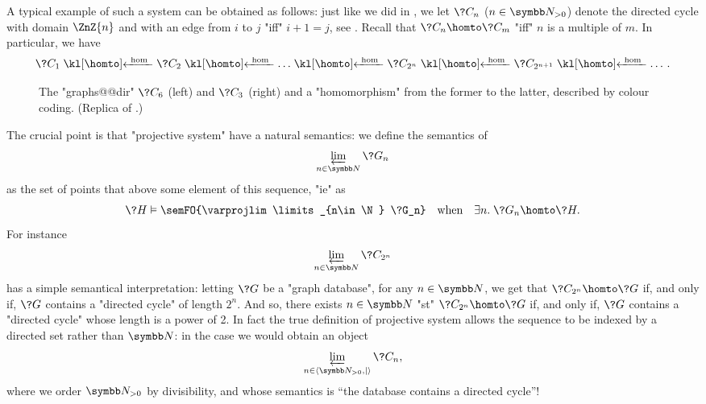 A typical example of such a system can be obtained as follows:
just like we did in ,
we let $\?C_n$ ($n\in\Np$) denote the directed cycle with domain $\ZnZ{n}$
and with an edge from $i$ to $j$ "iff" $i+1 = j$, see .
Recall that $\?C_n \homto \?C_m$ "iff" $n$ is a multiple of $m$.
In particular, we have
\[
	\?C_1 \cohomto \?C_2 \cohomto \dotsc \cohomto \?C_{2^n} \cohomto \?C_{2^{n+1}} \cohomto \dotsc.
\]
\begin{figure}
	\centering
	\caption{\AP\label{fig:conclu-db-cycles} The "graphs@@dir" $\?C_6$
	(left) and $\?C_3$ (right) and a "homomorphism" from the former
	to the latter, described by colour coding. (Replica of .)}
\end{figure}

The crucial point is that "projective system" have a natural semantics:
we define the semantics of \[\varprojlim\limits_{n\in\N} \?G_n\]
as the set of points that above some element of this sequence,
"ie" as
\[
	\?H \vDash \semFO{\varprojlim\limits_{n\in\N} \?G_n}
	\quad\text{when}\quad
	\exists n.\; \?G_n \homto \?H.
\]
For instance
\[\varprojlim\limits_{n\in\N} \?C_{2^n}\] has a simple
semantical interpretation:
letting $\?G$ be a "graph database", for any $n\in\N$, we get that $\?C_{2^n} \homto \?G$
if, and only if, $\?G$ contains a "directed cycle" of length $2^n$.
And so, there exists $n\in\N$ "st" $\?C_{2^n} \homto \?G$ if, and only if, $\?G$ contains
a "directed cycle" whose length is a power of 2.
In fact the true definition of projective system allows the sequence to
be indexed by a directed set rather than $\N$: in the case we would obtain
an object \[\varprojlim\limits_{n\in\tup{\Np,\mid}} \?C_{n},\] where we order $\Np$ by divisibility,
and whose semantics is ``the database contains a directed cycle''!

